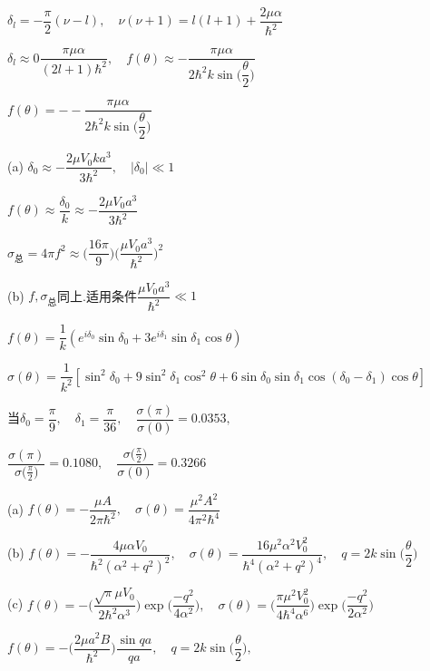 \newpage
\achapter

\answer $ \delta_{l}=-\dfrac{\pi}{2}(\nu-l),\quad \nu(\nu+1)=l(l+1)+\dfrac{2\mu\alpha}{\hbar^{2}} $

		$ \delta_{l}\approx0\dfrac{\pi\mu\alpha}{(2l+1)\hbar^{2}},\quad f(\theta)\approx-\dfrac{\pi\mu\alpha}{2\hbar^{2}k\sin\bigg(\dfrac{\theta}{2}\bigg)} $

\answer $ f(\theta)=--\dfrac{\pi\mu\alpha}{2\hbar^{2}k\sin\bigg(\dfrac{\theta}{2}\bigg)} $

\answer (a) $ \delta_{0}\approx-\dfrac{2\mu V_{0}ka^{3}}{3\hbar^{2}},\quad|\delta_{0}|\ll 1 $

	\aindent$ f(\theta)\approx\dfrac{\delta_{0}}{k}\approx-\dfrac{2\mu V_{0}a^{3}}{3\hbar^{2}} $
	
	\aindent$ \sigma_{\text{总}}=4\pi f^{2}\approx\bigg(\dfrac{16\pi}{9}\bigg)\bigg(\dfrac{\mu V_{0}a^{3}}{\hbar^{2}}\bigg)^{2} $
	
		(b) $ f,\sigma_{\text{总}}$同上.适用条件$\dfrac{\mu V_{0}a^{3}}{\hbar^{2}}\ll 1$

\answer $ f(\theta)=\dfrac{1}{k}(e^{i\delta_{0}}\sin\delta_{0}+3e^{i\delta_{1}}\sin\delta_{1}\cos\theta) $

		$ \sigma(\theta)=\dfrac{1}{k^{2}}[\sin^{2}\delta_{0}+9\sin^{2}\delta_{1}\cos^{2}\theta+6\sin\delta_{0}\sin\delta_{1}\cos(\delta_{0}-\delta_{1})\cos\theta] $
		
		当$ \delta_{0}=\dfrac{\pi}{9},\quad \delta_{1}=\dfrac{\pi}{36},\quad \dfrac{\sigma(\pi)}{\sigma(0)}=\num{0.0353}, $
		
		$ \dfrac{\sigma(\pi)}{\sigma\bigg(\frac{\pi}{2}\bigg)}=\num{0.1080},\quad \dfrac{\sigma\bigg(\frac{\pi}{2}\bigg)}{\sigma(0)}=\num{0.3266} $

\answer (a) $ f(\theta)=-\dfrac{\mu A}{2\pi\hbar^{2}},\quad \sigma(\theta)=\dfrac{\mu^{2}A^{2}}{4\pi^{2}\hbar^{4}} $

		(b) $ f(\theta)=-\dfrac{4\mu\alpha V_{0}}{\hbar^{2}(\alpha^{2}+q^{2})^{2}},\quad \sigma(\theta)=\dfrac{16\mu^{2}\alpha^{2}V_{0}^{2}}{\hbar^{4}(\alpha^{2}+q^{2})^{4}},\quad q=2k\sin\bigg(\dfrac{\theta}{2}\bigg) $
		
		(c) $ f(\theta)=-\bigg(\dfrac{\sqrt{\pi}\mu V_{0}}{2\hbar^{2}\alpha^{3}}\bigg)\exp\bigg(\dfrac{-q^{2}}{4\alpha^{2}}\bigg),\quad \sigma(\theta)=\bigg(\dfrac{\pi\mu^{2}V_{0}^{2}}{4\hbar^{4}\alpha^{6}}\bigg)\exp\bigg(\dfrac{-q^{2}}{2\alpha^{2}}\bigg)  $

\answer $ f(\theta)=-\bigg(\dfrac{2\mu a^{2}B}{\hbar^{2}}\bigg)\dfrac{\sin qa}{qa},\quad q=2k\sin\bigg(\dfrac{\theta}{2}\bigg), $

